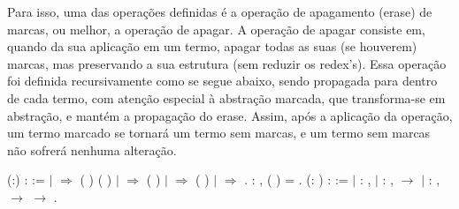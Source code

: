  Para isso, uma das operações definidas é a operação de apagamento (erase) de marcas, ou melhor,
a operação de apagar. A operação de apagar consiste em, quando da sua aplicação em um termo, apagar
todas as suas (se houverem) marcas, mas preservando a sua estrutura (sem reduzir os redex's). Essa operação
foi definida recursivamente como se segue abaixo, sendo propagada para dentro de cada termo, com atenção
especial à abstração marcada, que transforma-se em abstração, e mantém a propagação do erase. Assim, 
após a aplicação da operação, um termo marcado se tornará um termo sem marcas, e um termo sem marcas não
sofrerá nenhuma alteração.\begin{coqdoccode}
\coqdocemptyline
\coqdocnoindent
{}  (:) :  :=\coqdoceol
\coqdocindent{1.00em}
  \coqdoceol
\coqdocindent{1.00em}
\ensuremath{|}    \ensuremath{\Rightarrow}  ( ) ( )\coqdoceol
\coqdocindent{1.00em}
\ensuremath{|}   \ensuremath{\Rightarrow}  ( )\coqdoceol
\coqdocindent{1.00em}
\ensuremath{|}   \ensuremath{\Rightarrow}  ( )\coqdoceol
\coqdocindent{1.00em}
\ensuremath{|} \coqdocvar{\_} \ensuremath{\Rightarrow} \coqdoceol
\coqdocindent{1.00em}
.\coqdoceol
\coqdocemptyline
\coqdocemptyline
\coqdocnoindent
{} : \coqdockw{\ensuremath{\forall}} ,  ( ) =  .\coqdoceol
\coqdocemptyline
\coqdocnoindent
{}  (:  ) :   :=\coqdoceol
\coqdocnoindent
\ensuremath{|} : \coqdockw{\ensuremath{\forall}} ,    \coqdoceol
\coqdocnoindent
\ensuremath{|} : \coqdockw{\ensuremath{\forall}}  ,    \ensuremath{\rightarrow}    \coqdoceol
\coqdocnoindent
\ensuremath{|} : \coqdockw{\ensuremath{\forall}}   ,     \ensuremath{\rightarrow}     \ensuremath{\rightarrow}    .\coqdoceol

\end{coqdoccode}
